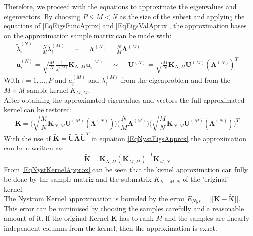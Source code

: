 Therefore, we proceed with the equations to approximate the eigenvalues and eigenvectors.
By choosing $P\le M<N$  as the size of the subset and applying the equations of \eqref{EqEigsFuncAprox} and \eqref{EqEigsValAprox}, the approximation bases on the approximation sample matrix can be made with:\cite{Zhang.2008}
\begin{equation}\label{EqNystEigsApprox}
	\begin{gathered}
			\tilde{\lambda}_i^{(N)} = \frac{N}{M}\lambda_i^{(M)} \>\>\>\>\> \sim \>\>\>\>\> \boldsymbol{\Lambda}^{(N)} =\frac{N}{M}\boldsymbol{\Lambda}^{(M)}\\
			\tilde{\mathbf{u}}_i^{(N)} = \sqrt{\frac{M}{N}}\frac{1}{\lambda_i^{(M)}}\mathbf{K}_{N,M}\mathbf{u}_i^{(M)}\>\>\>\>\> \sim \>\>\>\>\> \mathbf{U}^{(N)} = \sqrt{\frac{M}{N}}\mathbf{K}_{N,M}\mathbf{U}^{(M)}(\boldsymbol{\Lambda}^{(N)})^T
	\end{gathered}
\end{equation}
With $i=1,\dots,P$ and $u_i^{(M)}$ and $\lambda_i^{(M)}$ from the eigenproblem and from the $M\times M$ sample kernel $K_{M,M}$.\\
After obtaining the approximated eigenvalues and vectors the full approximated kernel can be restored:\cite{Williams.2000}\cite{Zhang.2008}
\begin{equation}\label{EqNystKernelEigsApprox}
	\tilde{\mathbf{K}} = \bigg(\sqrt{\frac{M}{N}}\mathbf{K}_{N,M}\mathbf{U}^{(M)}(\boldsymbol{\Lambda}^{(N)})\bigg)\bigg(\frac{N}{M}\boldsymbol{\Lambda}^{(M)}\bigg)\bigg(\sqrt{\frac{M}{N}}\mathbf{K}_{N,M}\mathbf{U}^{(M)}(\boldsymbol{\Lambda}^{(N)})\bigg)^T 
\end{equation}
With the use of $\tilde{\mathbf{K}} = \tilde{\mathbf{U}}\tilde{\mathbf{\Lambda}}\tilde{\mathbf{U}}^T$ in equation \eqref{EqNystEigsApprox} the approximation can be rewritten as:
\begin{equation}\label{EqNystKernelApprox}
		\tilde{\mathbf{K}} = \mathbf{K}_{N,M}(\mathbf{K}_{M,M})^{-1}\mathbf{K}_{M,N}
\end{equation}
From \eqref{EqNystKernelApprox} can be seen that the kernel approximation can fully be done by the sample matrix and the submatrix $K_{N-M, N}$ of the 'original' kernel.\cite{Williams.2000}\\
The Nyström Kernel approximation is bounded by the error  $E_{Nys}=||\mathbf{K}-\tilde{\mathbf{K}}||$.\cite{He.2017}
This error can be minimised by choosing the samples carefully and a reasonable amount of it.
If the original Kernel $\mathbf{K}$ has to rank $M$ and the samples are linearly independent columns from the kernel, then the approximation is exact.
